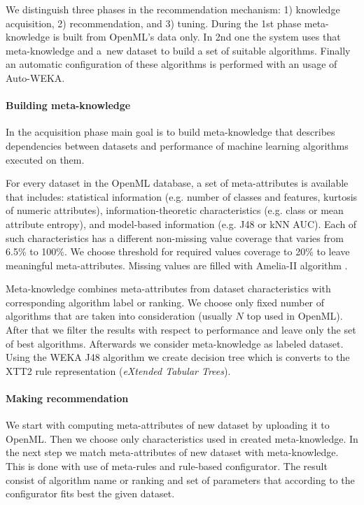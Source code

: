 \documentclass[a4paper]{llncs}
\let\oldparagraph\paragraph
\renewcommand{\paragraph}[1]{\oldparagraph{\textbf{#1}}}
\begin{document}
We distinguish three phases in the recommendation mechanism: 1) knowledge acquisition, 2) recommendation, and 3) tuning. During the 1st phase meta-knowledge is built from OpenML's data only. In 2nd one the system uses that meta-knowledge and a~new dataset to build a set of suitable algorithms. Finally an automatic configuration of these algorithms is performed with an usage of Auto-WEKA.

\vspace{-0.3em}

\paragraph{Building meta-knowledge}

In the acquisition phase main goal is to build meta-knowledge that describes dependencies between datasets and performance of machine learning algorithms executed on them. 

For every dataset in the OpenML database, a set of meta-attributes is available that includes: statistical information  (e.g. number of classes and features, kurtosis of numeric attributes), information-theoretic characteristics (e.g. class or mean attribute entropy), and model-based information (e.g. J48 or kNN AUC). Each of such characteristics has a different non-missing value coverage that varies from 6.5\% to 100\%. We choose threshold for required values coverage to 20\% to leave meaningful meta-attributes. Missing values are filled with Amelia-II algorithm \cite{HonakerKingBlackwell2011}.

Meta-knowledge combines meta-attributes from dataset characteristics with corresponding algorithm label or ranking. We choose only fixed number of algorithms that are taken into consideration (usually $N$ top used in OpenML). After that we filter the results with respect to performance and leave only the set of best algorithms. Afterwards we consider meta-knowledge as labeled dataset. Using the WEKA J48 algorithm we create decision tree which is converts to the XTT2 rule representation (\textit{eXtended Tabular Trees}).

\vspace{-0.3em}

\paragraph{Making recommendation}

We start with computing meta-attributes of new dataset by uploading it to OpenML. Then we choose only characteristics used in created meta-knowledge. In the next step we match meta-attributes of new dataset with meta-knowledge. This is done with use of meta-rules and rule-based configurator. The result consist of algorithm name or ranking and set of parameters that according to the configurator fits best the given dataset.
\end{document}
